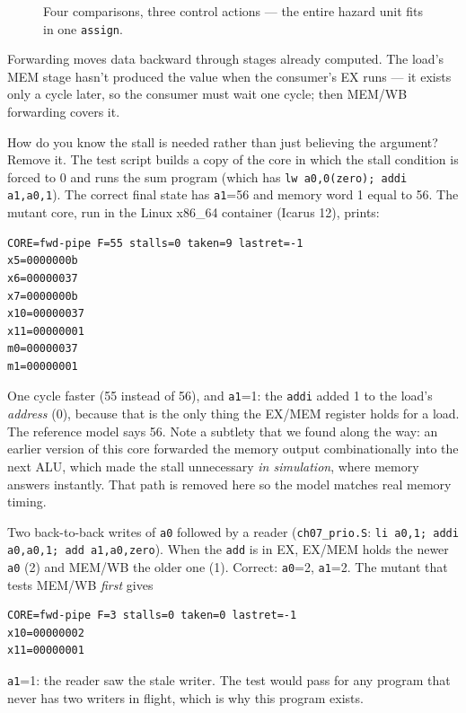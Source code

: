 \begin{figure}[t]
\centering

\caption[Hazard unit]{Four comparisons, three control actions ---
the entire hazard unit fits in one \texttt{assign}.}
\label{fig:hazardunit07}
\end{figure}

\begin{checkpoint}\label{cp:load07}
Forwarding moves data backward through stages already computed. The
load's MEM stage hasn't produced the value when the consumer's EX
runs --- it exists only a cycle later, so the consumer must wait
one cycle; then MEM/WB forwarding covers it.
\end{checkpoint}

\begin{example}\label{ex:nostall07}
How do you know the stall is needed rather than just believing the
argument? Remove it. The test script builds a copy of the core in which
the stall condition is forced to 0 and runs the sum program (which has
\texttt{lw a0,0(zero); addi a1,a0,1}). The correct final state has
\texttt{a1}=56 and memory word 1 equal to 56. The mutant core, run in
the Linux x86\_64 container (Icarus 12), prints:
\begin{lstlisting}
CORE=fwd-pipe F=55 stalls=0 taken=9 lastret=-1
x5=0000000b
x6=00000037
x7=0000000b
x10=00000037
x11=00000001
m0=00000037
m1=00000001
\end{lstlisting}
One cycle faster (55 instead of 56), and \texttt{a1}=1: the \texttt{addi}
added 1 to the load's \emph{address} (0), because that is the only
thing the EX/MEM register holds for a load. The reference model says
56. Note a subtlety that we found along the way: an earlier version of
this core forwarded the memory output combinationally into the next
ALU, which made the stall unnecessary \emph{in simulation}, where
memory answers instantly. That path is removed here so the model
matches real memory timing.
\end{example}

\begin{example}\label{ex:prio07}
Two back-to-back writes of \texttt{a0} followed by a reader
(\texttt{ch07\_prio.S}: \texttt{li a0,1; addi a0,a0,1; add a1,a0,zero}).
When the \texttt{add} is in EX, EX/MEM holds the newer \texttt{a0}
(2) and MEM/WB the older one (1). Correct: \texttt{a0}=2, \texttt{a1}=2.
The mutant that tests MEM/WB \emph{first} gives
\begin{lstlisting}
CORE=fwd-pipe F=3 stalls=0 taken=0 lastret=-1
x10=00000002
x11=00000001
\end{lstlisting}
\texttt{a1}=1: the reader saw the stale writer. The test would pass for
any program that never has two writers in flight, which is why this
program exists.
\end{example}

